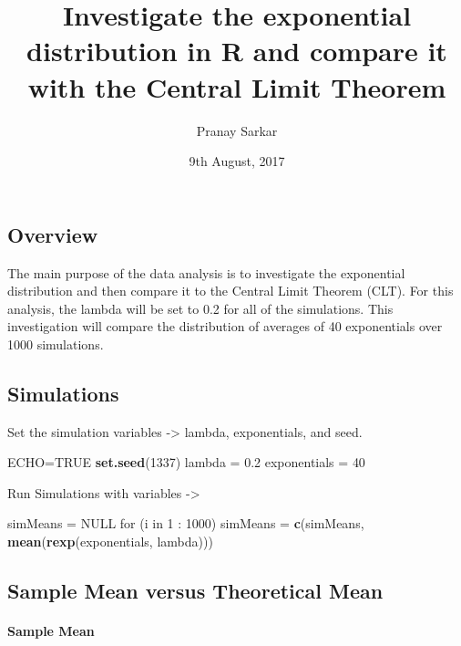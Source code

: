 \documentclass[]{article}
\title{Investigate the exponential distribution in R and compare it with the
Central Limit Theorem}
\author{Pranay Sarkar}
\date{9th August, 2017}
\newenvironment{Shaded}{\begin{snugshade}}{\end{snugshade}}
\newcommand{\KeywordTok}[1]{\textcolor[rgb]{0.13,0.29,0.53}{\textbf{{#1}}}}
\newcommand{\DecValTok}[1]{\textcolor[rgb]{0.00,0.00,0.81}{{#1}}}
\newcommand{\FloatTok}[1]{\textcolor[rgb]{0.00,0.00,0.81}{{#1}}}
\newcommand{\StringTok}[1]{\textcolor[rgb]{0.31,0.60,0.02}{{#1}}}
\newcommand{\OtherTok}[1]{\textcolor[rgb]{0.56,0.35,0.01}{{#1}}}
\newcommand{\NormalTok}[1]{{#1}}
\let\oldparagraph\paragraph
\renewcommand{\paragraph}[1]{\oldparagraph{#1}\mbox{}}
\begin{document}
\maketitle

\subsection{Overview}\label{overview}

The main purpose of the data analysis is to investigate the exponential
distribution and then compare it to the Central Limit Theorem (CLT). For
this analysis, the lambda will be set to 0.2 for all of the simulations.
This investigation will compare the distribution of averages of 40
exponentials over 1000 simulations.

\subsection{Simulations}\label{simulations}

Set the simulation variables -\textgreater{} lambda, exponentials, and
seed.

\begin{Shaded}
\begin{Highlighting}[]
\NormalTok{ECHO=}\OtherTok{TRUE}
\KeywordTok{set.seed}\NormalTok{(}\DecValTok{1337}\NormalTok{)}
\NormalTok{lambda =}\StringTok{ }\FloatTok{0.2}
\NormalTok{exponentials =}\StringTok{ }\DecValTok{40}
\end{Highlighting}
\end{Shaded}

Run Simulations with variables -\textgreater{}

\begin{Shaded}
\begin{Highlighting}[]
\NormalTok{simMeans =}\StringTok{ }\OtherTok{NULL}
\NormalTok{for (i in }\DecValTok{1} \NormalTok{:}\StringTok{ }\DecValTok{1000}\NormalTok{) simMeans =}\StringTok{ }\KeywordTok{c}\NormalTok{(simMeans, }\KeywordTok{mean}\NormalTok{(}\KeywordTok{rexp}\NormalTok{(exponentials, lambda)))}
\end{Highlighting}
\end{Shaded}

\subsection{Sample Mean versus Theoretical
Mean}\label{sample-mean-versus-theoretical-mean}

\paragraph{Sample Mean}\label{sample-mean}
\end{document}
